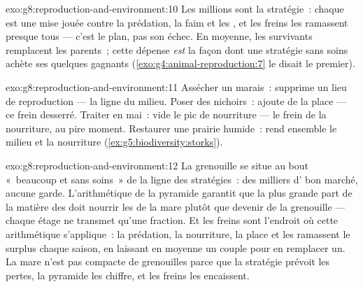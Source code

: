 \begin{solution}{exo:g8:reproduction-and-environment:10}
Les millions sont la stratégie~: chaque  est une mise jouée
contre la prédation, la faim et les , et les freins les
ramassent presque tous --- c'est le plan, pas son échec. En moyenne,
les survivants remplacent les parents~; cette dépense \emph{est} la
façon dont une stratégie sans soins achète ses quelques gagnants
(\cref{exo:g4:animal-reproduction:7} le disait le premier).
\end{solution}

\begin{solution}{exo:g8:reproduction-and-environment:11}
Assécher un marais~: supprime un lieu de reproduction --- la ligne
du milieu. Poser des nichoirs~: ajoute de la place --- ce frein
desserré. Traiter en mai~: vide le pic de nourriture --- le frein de
la nourriture, au pire moment. Restaurer une prairie humide~: rend
ensemble le milieu et la nourriture
(\cref{ex:g5:biodiversity:storks}).
\end{solution}

\begin{solution}{exo:g8:reproduction-and-environment:12}
La grenouille se situe au bout «~beaucoup et sans soins~» de la
ligne des stratégies~: des milliers d' bon marché, aucune garde.
L'arithmétique de la pyramide garantit que la plus grande part de la
matière des  doit nourrir les  de la mare
plutôt que devenir de la grenouille --- chaque étage ne transmet
qu'une fraction. Et les freins sont l'endroit où cette arithmétique
s'applique~: la prédation, la nourriture, la place et les 
ramassent le surplus chaque saison, en laissant en moyenne un couple
pour en remplacer un. La mare n'est pas compacte de grenouilles
parce que la stratégie prévoit les pertes, la pyramide les chiffre,
et les freins les encaissent.
\end{solution}

